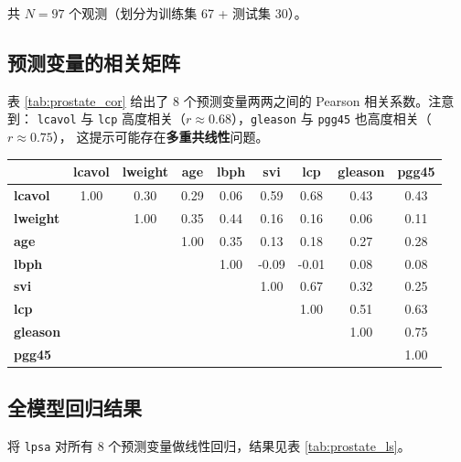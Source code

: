 共 $N = 97$ 个观测（划分为训练集 67 + 测试集 30）。

\subsection{预测变量的相关矩阵}

表 \ref{tab:prostate_cor} 给出了 8 个预测变量两两之间的 Pearson 相关系数。注意到：
\texttt{lcavol} 与 \texttt{lcp} 高度相关（$r \approx 0.68$），\texttt{gleason} 与 \texttt{pgg45} 也高度相关（$r \approx 0.75$），
这提示可能存在\textbf{多重共线性}问题。

\begin{center}
\renewcommand{\arraystretch}{1.2}
\small
\begin{tabular}{l|cccccccc}
\toprule
& \textbf{lcavol} & \textbf{lweight} & \textbf{age} & \textbf{lbph} & \textbf{svi} & \textbf{lcp} & \textbf{gleason} & \textbf{pgg45} \\
\midrule
\textbf{lcavol}   & 1.00 & 0.30 & 0.29 & 0.06 & 0.59 & 0.68 & 0.43 & 0.43 \\
\textbf{lweight}  &      & 1.00 & 0.35 & 0.44 & 0.16 & 0.16 & 0.06 & 0.11 \\
\textbf{age}      &      &      & 1.00 & 0.35 & 0.13 & 0.18 & 0.27 & 0.28 \\
\textbf{lbph}     &      &      &      & 1.00 & -0.09 & -0.01 & 0.08 & 0.08 \\
\textbf{svi}      &      &      &      &      & 1.00 & 0.67 & 0.32 & 0.25 \\
\textbf{lcp}      &      &      &      &      &      & 1.00 & 0.51 & 0.63 \\
\textbf{gleason}  &      &      &      &      &      &      & 1.00 & 0.75 \\
\textbf{pgg45}    &      &      &      &      &      &      &      & 1.00 \\
\bottomrule
\end{tabular}
\end{center}

\subsection{全模型回归结果}

将 \texttt{lpsa} 对所有 8 个预测变量做线性回归，结果见表 \ref{tab:prostate_ls}。

